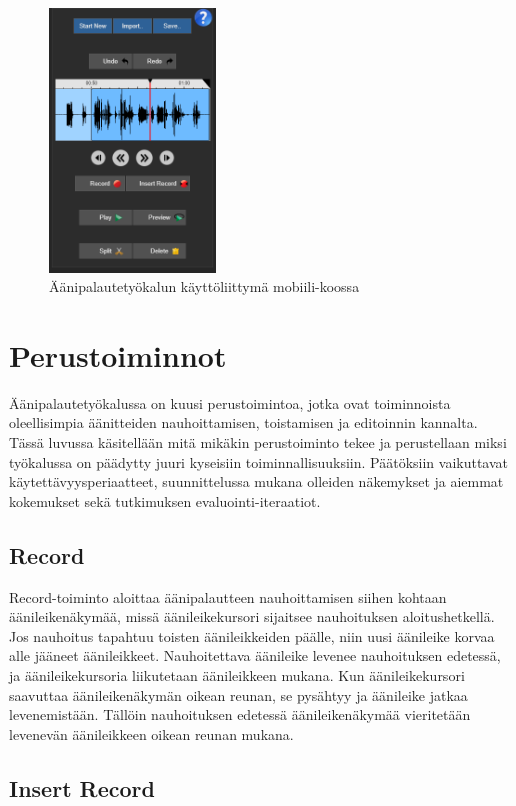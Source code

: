 \documentclass[utf8]{gradu3}
\begin{document}
\begin{figure}[h]\centering
  \includegraphics[height=7cm,keepaspectratio]{UI_mobile}
  \caption[]{Äänipalautetyökalun käyttöliittymä mobiili-koossa}
  \label{fig:UI_mobile}
\end{figure}

\section{Perustoiminnot}

Äänipalautetyökalussa on kuusi perustoimintoa, jotka ovat toiminnoista oleellisimpia äänitteiden nauhoittamisen, toistamisen ja editoinnin kannalta. Tässä luvussa käsitellään mitä mikäkin perustoiminto tekee ja perustellaan miksi työkalussa on päädytty juuri kyseisiin toiminnallisuuksiin. Päätöksiin vaikuttavat käytettävyysperiaatteet, suunnittelussa mukana olleiden näkemykset ja aiemmat kokemukset sekä tutkimuksen evaluointi-iteraatiot.


\subsection{Record}

Record-toiminto aloittaa äänipalautteen nauhoittamisen siihen kohtaan äänileikenäkymää, missä äänileikekursori sijaitsee nauhoituksen aloitushetkellä. Jos nauhoitus tapahtuu toisten äänileikkeiden päälle, niin uusi äänileike korvaa alle jääneet äänileikkeet. Nauhoitettava äänileike levenee nauhoituksen edetessä, ja äänileikekursoria liikutetaan äänileikkeen mukana. Kun äänileikekursori saavuttaa äänileikenäkymän oikean reunan, se pysähtyy ja äänileike jatkaa levenemistään. Tällöin nauhoituksen edetessä äänileikenäkymää vieritetään levenevän äänileikkeen oikean reunan mukana.

\subsection{Insert Record}
\end{document}
